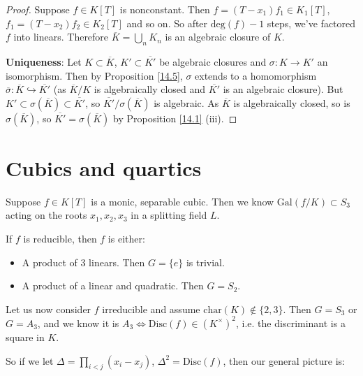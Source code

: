 \documentclass{article}
\theoremstyle{definition}
\begin{document}
\begin{proof}
    Suppose $f \in K[T]$ is nonconstant. Then $f=(T-x_1)f_1 \in K_1[T]$, $f_1=(T-x_2)f_2 \in K_2[T]$ and so on. So after $\text{deg}(f)-1$ steps, we've factored $f$ into linears. Therefore $\overline{K} = \bigcup_{n} K_n$ is an algebraic closure of $K$.
    \vspace{1mm}
    
    \textbf{Uniqueness}: Let $K \subset \overline{K}$, $K' \subset \overline{K'}$ be algebraic closures and $\sigma : K \to K'$ an isomorphism. Then by Proposition \ref{14.5}, $\sigma$ extends to a homomorphism $\overline{\sigma}: \overline{K} \hookrightarrow \overline{K'}$ (as $\overline{K}/K$ is algebraically closed and $\overline{K'}$ is an algebraic closure). But $K' \subset \sigma(\overline{K}) \subset \overline{K'}$, so $\overline{K'}/\sigma(\overline{K})$ is algebraic. As $\overline{K}$ is algebraically closed, so is $\sigma(\overline{K})$, so $\overline{K'}=\sigma(\overline{K})$ by Proposition \ref{14.1} (iii).
\end{proof}

\section{Cubics and quartics}

Suppose $f \in K[T]$ is a monic, separable cubic. Then we know $\text{Gal}(f/K) \subset S_3$ acting on the roots $x_1,x_2,x_3$ in a splitting field $L$.
\vspace{1mm}

If $f$ is reducible, then $f$ is either:
\begin{itemize}
    \item A product of 3 linears. Then $G = \{e\}$ is trivial.
    \item A product of a linear and quadratic. Then $G=S_2$.
\end{itemize}
Let us now consider $f$ irreducible and assume $\text{char}(K) \not\in \{2,3\}$. Then $G=S_3$ or $G=A_3$, and we know it is $A_3 \iff \text{Disc}(f) \in (K^\times)^2$, i.e. the discriminant is a square in $K$.
\vspace{1mm}

So if we let $\Delta=\prod_{i<j}^{} (x_i-x_j)$, $\Delta^2=\text{Disc}(f)$, then our general picture is:

\begin{figure}[H]
    \centering
\end{figure}
\end{document}
